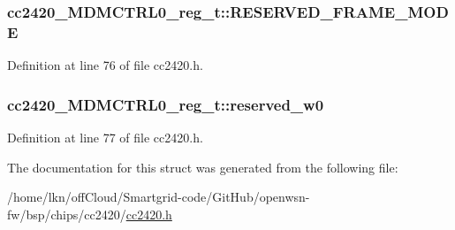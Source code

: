 \subsubsection[{\texorpdfstring{R\+E\+S\+E\+R\+V\+E\+D\+\_\+\+F\+R\+A\+M\+E\+\_\+\+M\+O\+DE}{RESERVED_FRAME_MODE}}]{ cc2420\+\_\+\+M\+D\+M\+C\+T\+R\+L0\+\_\+reg\+\_\+t\+::\+R\+E\+S\+E\+R\+V\+E\+D\+\_\+\+F\+R\+A\+M\+E\+\_\+\+M\+O\+DE}\hypertarget{structcc2420___m_d_m_c_t_r_l0__reg__t_a15d3de5639d13a6edfc8004cbc9cce8e}{}\label{structcc2420___m_d_m_c_t_r_l0__reg__t_a15d3de5639d13a6edfc8004cbc9cce8e}


Definition at line 76 of file cc2420.\+h.

\subsubsection[{\texorpdfstring{reserved\+\_\+w0}{reserved_w0}}]{ cc2420\+\_\+\+M\+D\+M\+C\+T\+R\+L0\+\_\+reg\+\_\+t\+::reserved\+\_\+w0}\hypertarget{structcc2420___m_d_m_c_t_r_l0__reg__t_ae4feeecd96c3d1611db9260e8e588490}{}\label{structcc2420___m_d_m_c_t_r_l0__reg__t_ae4feeecd96c3d1611db9260e8e588490}


Definition at line 77 of file cc2420.\+h.



The documentation for this struct was generated from the following file\+:\begin{DoxyCompactItemize}
\item 
/home/lkn/off\+Cloud/\+Smartgrid-\/code/\+Git\+Hub/openwsn-\/fw/bsp/chips/cc2420/\hyperlink{cc2420_8h}{cc2420.\+h}\end{DoxyCompactItemize}
